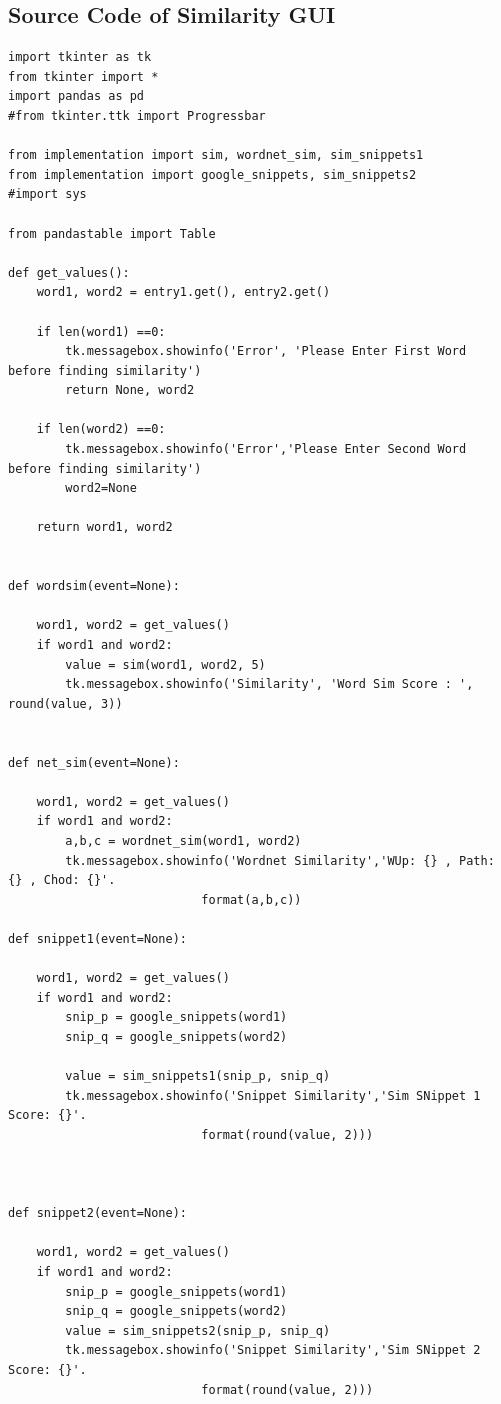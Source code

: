 \documentclass[conference]{IEEEtran}
\begin{document}
\begin{appendices}
\section{Source Code of Similarity GUI}\label{sec:append}
\begin{lstlisting}
import tkinter as tk
from tkinter import *
import pandas as pd
#from tkinter.ttk import Progressbar

from implementation import sim, wordnet_sim, sim_snippets1
from implementation import google_snippets, sim_snippets2
#import sys

from pandastable import Table

def get_values():
    word1, word2 = entry1.get(), entry2.get()
    
    if len(word1) ==0:
        tk.messagebox.showinfo('Error', 'Please Enter First Word before finding similarity')
        return None, word2
        
    if len(word2) ==0:
        tk.messagebox.showinfo('Error','Please Enter Second Word before finding similarity')
        word2=None
    
    return word1, word2
    
    
def wordsim(event=None):
    
    word1, word2 = get_values()
    if word1 and word2:
        value = sim(word1, word2, 5)
        tk.messagebox.showinfo('Similarity', 'Word Sim Score : ', round(value, 3))


def net_sim(event=None):
     
    word1, word2 = get_values()
    if word1 and word2:
        a,b,c = wordnet_sim(word1, word2)
        tk.messagebox.showinfo('Wordnet Similarity','WUp: {} , Path: {} , Chod: {}'.
                           format(a,b,c))

def snippet1(event=None):

    word1, word2 = get_values()        
    if word1 and word2:
        snip_p = google_snippets(word1)
        snip_q = google_snippets(word2)
        
        value = sim_snippets1(snip_p, snip_q)
        tk.messagebox.showinfo('Snippet Similarity','Sim SNippet 1 Score: {}'.
                           format(round(value, 2)))
     


def snippet2(event=None):

    word1, word2 = get_values()        
    if word1 and word2:
        snip_p = google_snippets(word1)
        snip_q = google_snippets(word2)
        value = sim_snippets2(snip_p, snip_q)
        tk.messagebox.showinfo('Snippet Similarity','Sim SNippet 2 Score: {}'.
                           format(round(value, 2)))




\end{lstlisting}
\end{appendices}
\end{document}
